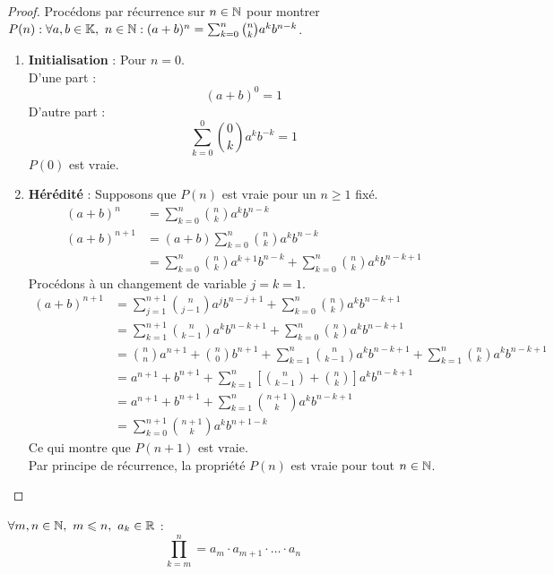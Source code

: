 \begin{proof}
	Procédons par récurrence sur $n \in \mathbb{N}$ pour montrer $P(n) : \forall a, b \in \mathbb{K},\ n \in \mathbb{N} : (a + b)^n = \sum_{k = 0}^{n} \binom{n}{k} a^kb^{n-k}$.
	\begin{enumerate}
		\item \textbf{Initialisation} : Pour $n = 0$.
		\\
		D'une part :
		\[ (a + b)^0 = 1 \]
		D'autre part :
		\[ \sum_{k = 0}^{0} \binom{0}{k} a^k b^{-k} = 1 \]
		$P(0)$ est vraie.
		\item \textbf{Hérédité} : Supposons que $P(n)$ est vraie pour un $n \geq 1$ fixé.
		\\
		\begin{align*}
			(a + b)^n &= \sum_{k=0}^{n} \binom{n}{k} a^k b^{n-k} \\
			(a + b)^{n+1} &= (a+b) \sum_{k=0}^{n} \binom{n}{k} a^k b^{n-k} \\
			&= \sum_{k = 0}^{n} \binom{n}{k} a^{k+1} b^{n-k} + \sum_{k=0}^{n} \binom{n}{k} a^k b^{n - k + 1}
		\end{align*}
		Procédons à un changement de variable $j = k = 1$.
		\begin{align*}
			(a + b)^{n+1} &= \sum_{j = 1}^{n + 1} \binom{n}{j - 1} a^j b^{n - j + 1} + \sum_{k = 0}^{n} \binom{n}{k} a^k b^{n-k+1} \\
			&= \sum_{k = 1}^{n + 1} \binom{n}{k - 1} a^k b^{n - k + 1} + \sum_{k = 0}^{n} \binom{n}{k} a^k b^{n - k + 1} \\
			&= \binom{n}{n} a^{n+1} + \binom{n}{0} b^{n+1} + \sum_{k = 1}^{n} \binom{n}{k - 1} a^k b^{n - k + 1} + \sum_{k = 1}^{n} \binom{n}{k} a^k b^{n - k + 1} \\
			&= a^{n+1} + b^{n+1} + \sum_{k = 1}^{n} \left[ \binom{n}{k - 1} + \binom{n}{k} \right] a^k b^{n - k + 1} \\
			&= a^{n+1} + b^{n+1} + \sum_{k=1}^{n} \binom{n+1}{k} a^k b^{n - k + 1} \\
			&= \sum_{k=0}^{n+1} \binom{n + 1}{k} a^k b^{n + 1 - k}
		\end{align*}
		Ce qui montre que $P(n+1)$ est vraie. 
		\\
		Par principe de récurrence, la propriété $P(n)$ est vraie pour tout $n \in \mathbb{N}$.
	\end{enumerate}
\end{proof}

\begin{definition}[Produit]
    $\forall m, n \in \mathbb{N},\ m \leqslant n,\ a_k \in \mathbb{R}$ :
    \[ \prod_{k = m}^{n} = a_m \cdot a_{m+1} \cdot \ldots \cdot a_n \]
\end{definition}